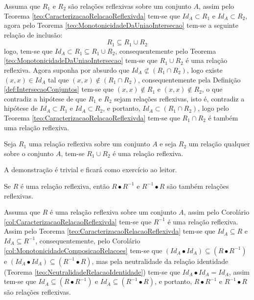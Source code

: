 \begin{prova}
	Assuma que $R_1$ e $R_2$ são relações reflexivas sobre um conjunto $A$, assim pelo Teorema \ref{teo:CaracterizacaoRelacaoReflexivda} tem-se que $Id_A \subset R_1$ e $Id_A \subset R_2$, agora pelo Teorema \ref{teo:MonotonicidadeDaUniaoIntersecao} tem-se a seguinte relação de inclusão:
	$$R_1 \subseteq R_1 \cup R_2$$
	logo, tem-se que $Id_A \subset R_1 \subseteq R_1 \cup R_2$, consequentemente pelo Teorema \ref{teo:MonotonicidadeDaUniaoIntersecao} tem-se que $R_1 \cup R_2$ é uma relação reflexiva. Agora suponha por absurdo que $Id_A \not\subset (R_1 \cap R_2)$, logo existe $(x, x) \in Id_A$ tal que $(x, x) \notin (R_1 \cap R_2)$, consequentemente pela Definição \ref{def:IntersecaoConjuntos} tem-se que $(x, x) \notin R_1$ e $(x, x) \notin R_2$, o que contradiz a hipótese de que $R_1$ e $R_2$ sejam relações reflexivas, isto é, contradiz a hipótese de $Id_A \subset R_1$ e $Id_A \subset R_2$, e portanto, $Id_A \subset (R_1 \cap R_2)$, logo pelo Teorema \ref{teo:CaracterizacaoRelacaoReflexivda} tem-se que $R_1 \cap R_2$ é também uma relação reflexiva.
\end{prova}

\begin{teorema}
	Seja $R_1$ uma relação reflexiva sobre um conjunto $A$ e seja $R_2$ um relação qualquer sobre o conjunto $A$, tem-se $R_1 \cup R_2$ é uma relação reflexiva.
\end{teorema}

\begin{prova}
	A demonstração é trivial e ficará como exercício ao leitor.
\end{prova}

\begin{teorema}
	Se $R$ é uma relação reflexiva, então $R \bullet R^{-1}$ e $R^{-1} \bullet R$ são também relações reflexivas.
\end{teorema}

\begin{prova}
	Assuma que $R$ é uma relação reflexiva sobre um conjunto $A$, assim pelo Corolário \ref{col:CaracterizacaoRelacaoReflexivda} tem-se que $R^{-1}$ é uma relação reflexiva. Assim pelo Teorema \ref{teo:CaracterizacaoRelacaoReflexivda} tem-se que $Id_A \subseteq R$ e $Id_A \subseteq R^{-1}$, consequentemente, pelo Corolário \ref{col:MonotonicidadeComposicaoRelacoes} tem-se que $(Id_A \bullet Id_A) \subseteq (R \bullet R^{-1})$ e $(Id_A \bullet Id_A) \subseteq (R^{-1} \bullet R)$, mas pela neutralidade da relação identidade (Teorema \ref{teo:NeutralidadeRelacaoIdentidade}) tem-se que $Id_A \bullet Id_A = Id_A$, assim tem-se que  $Id_A \subseteq (R \bullet R^{-1})$ e $Id_A \subseteq (R^{-1} \bullet R)$, e portanto, $R \bullet R^{-1}$ e $R^{-1} \bullet R$ são relações reflexivas.
\end{prova}

